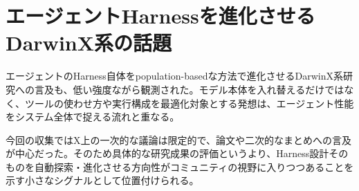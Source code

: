 \section{エージェントHarnessを進化させるDarwinX系の話題}

エージェントのHarness自体をpopulation-basedな方法で進化させるDarwinX系研究への言及も、低い強度ながら観測された。モデル本体を入れ替えるだけではなく、ツールの使わせ方や実行構成を最適化対象とする発想は、エージェント性能をシステム全体で捉える流れと重なる。

今回の収集ではX上の一次的な議論は限定的で、論文や二次的なまとめへの言及が中心だった。そのため具体的な研究成果の評価というより、Harness設計そのものを自動探索・進化させる方向性がコミュニティの視野に入りつつあることを示す小さなシグナルとして位置付けられる。
